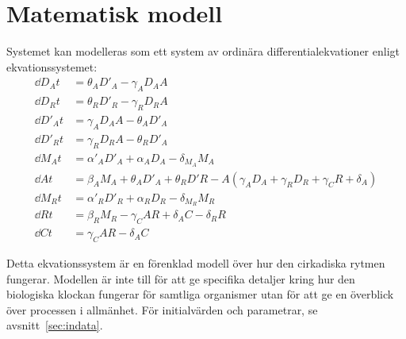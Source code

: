 \section{Matematisk modell}
\label{sec:modell}

Systemet kan modelleras som ett system av ordinära differentialekvationer
enligt ekvationssystemet:
\begin{align}
\dd {D_A} t &= \theta_A D'_A - \gamma_A D_A A \\
\dd {D_R} t &= \theta_R D'_R - \gamma_R D_R A \\
\dd {D'_A} t &= \gamma_A D_A A - \theta_A D'_A \\
\dd {D'_R} t &= \gamma_R D_R A - \theta_R D'_A \\
\dd {M_A} t &= \alpha'_A D'_A + \alpha_A D_A - \delta_{M_A}M_A \\
\dd A t &= \beta_A M_A + \theta_AD'_A + \theta_RD'R - A (\gamma_A D_A +
	\gamma_R D_R + \gamma_C R + \delta_A) \\
\dd {M_R} t &= \alpha'_R D'_R + \alpha_R D_R - \delta_{M_R} M_R \\
\dd R t &= \beta_R M_R - \gamma_C A R + \delta_A C - \delta_R R \\
\dd C t &= \gamma_C A R - \delta_A C
\label{eqn:ode}
\end{align}

Detta ekvationssystem är en förenklad modell över hur den cirkadiska rytmen fungerar. Modellen är inte till för att ge specifika detaljer kring hur den biologiska klockan fungerar för samtliga organismer utan för att ge en överblick över processen i allmänhet. För initialvärden och parametrar, se avsnitt~\ref{sec:indata}.

